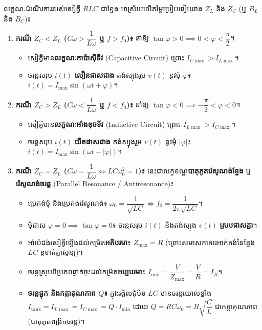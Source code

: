 \noindent
លក្ខណៈដំណើរការរបស់សៀគ្វី $RLC$ ជាខ្នែង អាស្រ័យលើតម្លៃប្រៀបធៀបរវាង $Z_L$ និង $Z_C$ (ឬ $B_L$ និង $B_C$)៖
\begin{enumerate}[label=\textbf{\arabic*.} ,itemsep=1pt, topsep=1pt, parsep=0pt, leftmargin=1.5em]
	\item \textbf{ករណី $Z_C < Z_L$ ($C\omega > \dfrac{1}{L\omega}$ ឬ $f > f_0$)៖} នាំឱ្យ $\tan\varphi > 0 \implies 0 < \varphi < \dfrac{\pi}{2}$។
	\begin{itemize}[itemsep=0.5pt, topsep=0.5pt, leftmargin=1.2em]
		\item សៀគ្វីមាន\textbf{លក្ខណៈកាប៉ាស៊ីទីវ} ({\englishfont Capacitive Circuit}) ព្រោះ $I_{C\max} > I_{L\max}$។
		\item ចរន្តសរុប $i(t)$ \textbf{លឿនផាសជាង} តង់ស្យុងរួម $v(t)$ នូវមុំ $\varphi$៖ $i(t) = I_{\max}\sin(\omega t + \varphi)$។
	\end{itemize}
	\item \textbf{ករណី $Z_C > Z_L$ ($C\omega < \dfrac{1}{L\omega}$ ឬ $f < f_0$)៖} នាំឱ្យ $\tan\varphi < 0 \implies -\dfrac{\pi}{2} < \varphi < 0$។
	\begin{itemize}[itemsep=0.5pt, topsep=0.5pt, leftmargin=1.2em]
		\item សៀគ្វីមាន\textbf{លក្ខណៈអាំងឌុចទីវ} ({\englishfont Inductive Circuit}) ព្រោះ $I_{L\max} > I_{C\max}$។
		\item ចរន្តសរុប $i(t)$ \textbf{យឺតផាសជាង} តង់ស្យុងរួម $v(t)$ នូវមុំ $|\varphi|$៖ $i(t) = I_{\max}\sin(\omega t - |\varphi|)$។
	\end{itemize}
	\item \textbf{ករណី $Z_C = Z_L$ ($C\omega = \dfrac{1}{L\omega} \iff LC\omega_0^2 = 1$)៖} នេះជាលក្ខខណ្ឌ\textbf{បាតុភូតរ៉េសូណង់ខ្នែង} ឬ \textbf{រ៉េសូណង់ចរន្ត} ({\englishfont Parallel Resonance / Antiresonance})៖
	\begin{itemize}[itemsep=0.5pt, topsep=0.5pt, leftmargin=1.2em]
		\item ប្រេកង់មុំ និងប្រេកង់រ៉េសូណង់៖ $\omega_0 = \dfrac{1}{\sqrt{LC}} \iff f_0 = \dfrac{1}{2\pi\sqrt{LC}}$។
		\item មុំផាស $\varphi = 0 \implies \tan\varphi = 0$៖ ចរន្តសរុប $i(t)$ និងតង់ស្យុង $v(t)$ \textbf{ស្របផាសគ្នា}។
		\item អាំប៉េដង់សៀគ្វីឡើងដល់កម្រិត\textbf{អតិបរមា}៖ $Z_{\max} = R$ (ព្រោះសមាសភាគរេអាក់តង់នៃខ្នែង $LC$ ទូទាត់គ្នាសូន្យ)។
		\item ចរន្តស្រូបពីប្រភពធ្លាក់ចុះដល់កម្រិត\textbf{អប្បបរមា}៖ $I_{\min} = \dfrac{V}{Z_{\max}} = \dfrac{V}{R} = I_R$។
		\item \textbf{ចរន្តផ្ទុក និងកត្តាគុណភាព $Q$៖} ក្នុងរង្វិលជុំបិទ $LC$ មានចរន្តយោលខ្លាំង $I_{\text{tank}} = I_{L\max} = I_{C\max} = Q \cdot I_{\min}$ ដោយ $Q = R C \omega_0 = R\sqrt{\dfrac{C}{L}}$ ជាកត្តាគុណភាព (បាតុភូតពង្រីកចរន្ត)។
	\end{itemize}
\end{enumerate}

